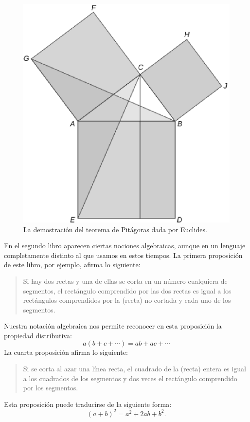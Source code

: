 \begin{figure}
   \centering
   \includegraphics[scale=0.4]{images/libroI_prop47}
   \caption{La demostración del teorema de Pitágoras dada por Euclides.}
   \label{fig:libroI_prop47}
\end{figure}

En el segundo libro aparecen ciertas nociones algebraicas, aunque en un
lenguaje completamente distinto al que usamos en estos tiempos. La primera
proposición de este libro, por ejemplo, afirma lo siguiente: 
\begin{quote}
	Si hay dos rectas
	y una de ellas se corta en un número cualquiera de segmentos, el rectángulo
	comprendido por las dos rectas es igual a los rectángulos comprendidos por la
	(recta) no cortada y cada uno de los segmentos.
\end{quote}
Nuestra notación algebraica
nos permite reconocer en esta proposición la propiedad distributiva: 
\[
	a(b+c+\cdots)=ab+ac+\cdots
\]
La cuarta proposición afirma lo siguiente: 

\begin{quote}
	Si se corta al azar una línea recta,
	el cuadrado de la (recta) entera es igual a los cuadrados de los segmentos y
	dos veces el rectángulo comprendido por los segmentos.
\end{quote}
Esta proposición puede traducirse de la siguiente forma:
\[
	(a+b)^2=a^2+2ab+b^2.
\]

